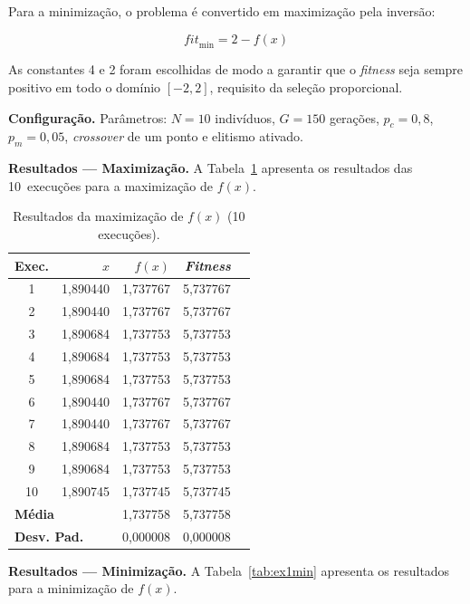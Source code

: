 \documentclass[12pt,twocolumn]{article}
\begin{document}
Para a minimização, o problema é convertido em maximização pela inversão:

\begin{equation}
  \mathit{fit}_{\min} = 2 - f(x)
  \label{eq:fitmin}
\end{equation}

As constantes 4 e 2 foram escolhidas de modo a garantir que o \textit{fitness} seja
sempre positivo em todo o domínio $[-2, 2]$, requisito da seleção proporcional.

\textbf{Configuração.} Parâmetros: $N = 10$ indivíduos, $G = 150$ gerações, $p_c = 0{,}8$,
$p_m = 0{,}05$, \textit{crossover} de um ponto e elitismo ativado.

\textbf{Resultados --- Maximização.}
A Tabela~\ref{tab:ex1max} apresenta os resultados das 10~execuções para a maximização
de $f(x)$.

\begin{table}[H]
\centering
\caption{Resultados da maximização de $f(x)$ (10 execuções).}
\label{tab:ex1max}
\small
\begin{tabular}{@{}crrrr@{}}
\toprule
Exec. & $x$ & $f(x)$ & \textit{Fitness} \\
\midrule
1  & 1,890440 &  1,737767 & 5,737767 \\
2  & 1,890440 &  1,737767 & 5,737767 \\
3  & 1,890684 &  1,737753 & 5,737753 \\
4  & 1,890684 &  1,737753 & 5,737753 \\
5  & 1,890684 &  1,737753 & 5,737753 \\
6  & 1,890440 &  1,737767 & 5,737767 \\
7  & 1,890440 &  1,737767 & 5,737767 \\
8  & 1,890684 &  1,737753 & 5,737753 \\
9  & 1,890684 &  1,737753 & 5,737753 \\
10 & 1,890745 &  1,737745 & 5,737745 \\
\midrule
\multicolumn{2}{l}{\textbf{Média}} & 1,737758 & 5,737758 \\
\multicolumn{2}{l}{\textbf{Desv. Pad.}} & 0,000008 & 0,000008 \\
\bottomrule
\end{tabular}
\end{table}

\textbf{Resultados --- Minimização.}
A Tabela~\ref{tab:ex1min} apresenta os resultados para a minimização de $f(x)$.
\end{document}
